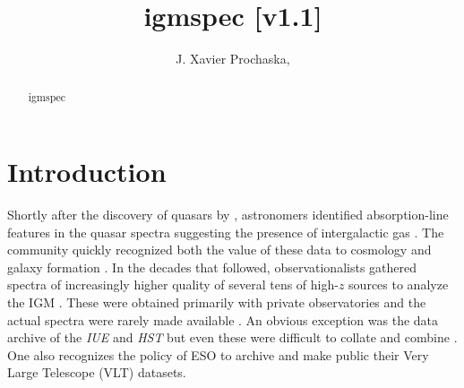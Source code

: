 \documentclass[12pt,preprint]{aastex}
\begin{document}
\def \lzlls {$\ell_{\rm{LLS}}(z)$}
\def \mllls {\ell_{\rm{LLS}}(X)}
\def \llls {$\ell_{\rm{LLS}}(X)$}
\def \ldla {$\ell_{\rm{DLA}}(X)$}
\def \lslls{$\ell_{\rm{SLLS}}(X)$}
\def \mlslls{\ell_{\rm{SLLS}}(X)}
\def \nlls {$n_{\rm LLS}$}
\def \slls {$\sigma_{\rm LLS}$}
\def \mnlls {n_{\rm LLS}}
\def \mslls {\sigma_{\rm LLS}}
\def \drlls {$\Delta r_{\rm LLS}$}
\def \mdrlls {\Delta r_{\rm LLS}}
\def \mlmfp {\lambda_{\rm mfp}^{912}}
\def \lmfp {$\lambda_{\rm mfp}^{912}$}
\def \mbplls {\beta_{\rm pLLS}}
\def \bplls {$\beta_{\rm pLLS}$}
\def \btlls {$\beta_{\rm LLS}$}
\def \mbtlls {\beta_{\rm LLS}}
\def \lteff {$\tau_{\rm eff,LL}$}
\def \teff {$\tau_{\rm eff,LL}$}
\def \tlya {$\tau_{\rm eff}^{\rm Ly\alpha}$}
\def \mtlya {\tau_{\rm eff}^{\rm Ly\alpha}}
\def \mteff {\tau_{\rm eff}}
\def \mllteff {\mteff^{912}}
\def \llteff {$\mteff^{912}$}
\def \mnmin {\mnhi^{\rm min}}
\def \nmin {$\mnhi^{\rm min}$}
\def \O {${\mathcal O}(N,X)$}
\newcommand{\cm}[1]{\, {\rm cm^{#1}}}
\def\N#1{{N({\rm #1})}}
\def\psol#1#2#3#4{$\{ {\rm #1}^{#2}/{\rm #3}^{#4}\}$}
\def\pxh{$\{ {\rm X/H} \}$}
\def \snrlim {SNR$_{lim}$}
\def\mglls {\gamma_{\rm LLS}}
\def\mavgt {<\mtll>}

\title{igmspec
[v1.1]}

\author{
J. Xavier Prochaska, 
}

\begin{abstract}
igmspec 
\end{abstract}



\section{Introduction}
\label{sec:intro}

Shortly after the discovery of quasars by \cite{schmidt6X},
astronomers identified absorption-line features in the quasar
spectra suggesting the presence of intergalactic gas
\citep{burbidge,bahcall}.  
The community quickly recognized both the value of these
data to cosmology and galaxy formation \cite{bahcall,spitzer}.
In the decades that followed, observationalists gathered
spectra of increasingly higher quality of several tens of
high-$z$ sources to analyze the IGM 
\citep{sargent,young,tytler,wolfe,lanzetta,bergeron}.
These were obtained primarily with private observatories and
the actual spectra were rarely made available
\citep[see][for a few exceptions]{dodorico_hdf}.
An obvious exception was the data archive of the
{\it IUE} and {\it HST} but even these were difficult to 
collate and combine \citep{jannuzi,bechtold}.
One also recognizes the policy of ESO to archive and
make public their Very Large Telescope (VLT) datasets.
\end{document}
